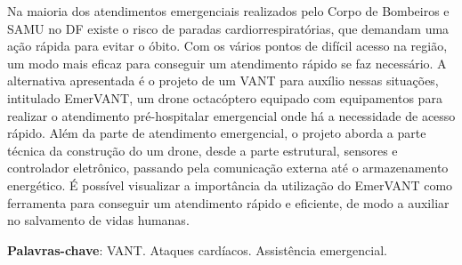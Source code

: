 \begin{resumo}
Na maioria dos atendimentos emergenciais realizados pelo Corpo de Bombeiros e SAMU no DF existe o risco de paradas cardiorrespiratórias, 
que demandam uma ação rápida para evitar o óbito. Com os vários pontos de difícil acesso na região, um modo mais eficaz para conseguir um atendimento 
rápido se faz necessário. A alternativa apresentada é o projeto de um VANT para auxílio nessas situações, intitulado EmerVANT, um drone octacóptero
equipado com equipamentos para realizar o atendimento pré-hospitalar emergencial onde há a necessidade de acesso rápido. Além da parte de atendimento emergencial, 
o projeto aborda a parte técnica da construção do um drone, desde a parte estrutural, sensores e controlador eletrônico, passando pela comunicação externa até o 
armazenamento energético. É possível visualizar a importância da utilização do EmerVANT como ferramenta para conseguir um atendimento rápido e eficiente, de modo a
auxiliar no salvamento de vidas humanas.


 \vspace{\onelineskip}
    
 \noindent
 \textbf{Palavras-chave}: VANT. Ataques cardíacos. Assistência emergencial.
\end{resumo}
